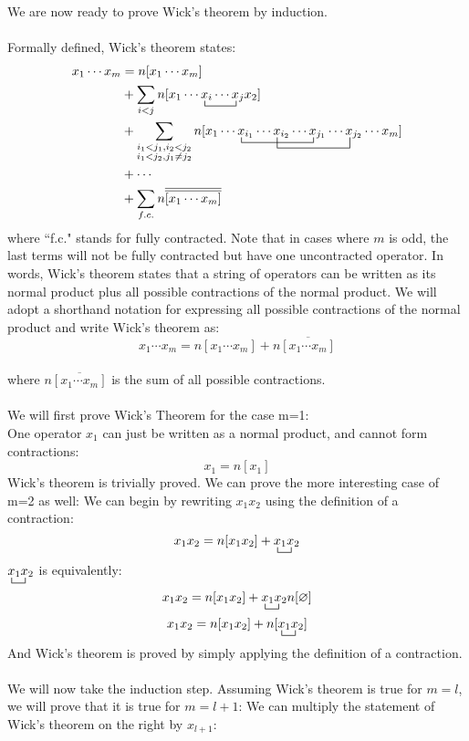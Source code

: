 \documentclass{article}
\newcommand{\ol}{\overline}
\newcommand{\ctr}{\bcontraction}
\newcommand{\cd}{\ensuremath{\cdots} }
\begin{document}
We are now ready to prove Wick's theorem by induction. \\ \\
Formally defined, Wick's theorem states: 
\begin{align*}
x_1 \cd x_m &= n[x_1 \cd x_m ]  \\
&+ \sum_{i < j} \ctr{n[x_1 \cd}{x}{{}_i \cd }{x} n[x_1 \cd x_i \cd x_j x_2] \\
&+ \sum_{\substack{i_1 < j_1,  i_2 < j_2 \\ i_1 < j_2, j_1 \neq j_2}} 
\ctr{n[x_1 \cd}{x}{{}_{i_1} \cd x_{i_2} \cd}{x}
\ctr[2ex]{n[x_1 \cd x_{i_1} \cd }{x}{{}_{i_2} \cd x_{j_1} \cd}{x}
n[x_1 \cd x_{i_1} \cd x_{i_2} \cd x_{j_1} \cd x_{j_2} \cd x_m ]  \\
&+ \cd \\
&+ \sum_{f.c.} n \ol{\ol{[x_1 \cd x_m]  }}
\end{align*}
where ``f.c." stands for fully contracted. 
Note that in cases where $m$ is odd, the last terms will not be fully contracted but have one uncontracted operator. 
In words, Wick's theorem states that a string of operators can be written as its normal product plus all possible contractions of the normal product. 
We will adopt a shorthand notation for expressing all possible contractions of the normal product and write Wick's theorem as: 
\[x_1 \cd x_m = n[x_1 \cd x_m ]  + n\ol{[x_1 \cd x_m ]} \]\\
where $n\ol{[x_1 \cd x_m ]}$ is the sum of all possible contractions.
\\ \\
We will first prove Wick's Theorem for the case m=1: 
\\
One operator $x_1$ can just be written as a normal product, and cannot form contractions:
\[x_1 = n[x_1] \]
Wick's theorem is trivially proved. 
We can prove the more interesting case of m=2 as well: 
We can begin by rewriting $x_1x_2$ using the definition of a contraction:
\[x_1x_2 = n[x_1x_2] + \ctr{}{x}{{}_1}{x} x_1 x_2\]
$\ctr{}{x}{{}_1}{x} x_1 x_2$ is equivalently: 
\[x_1x_2 = n[x_1x_2] + \ctr{}{x}{{}_1}{x} x_1 x_2 n[\varnothing]\]
\[ x_1x_2   = n[x_1x_2] + n[ \ctr{}{x}{{}_1}{x} x_1 x_2] \]
And Wick's theorem is proved by simply applying the definition of a contraction.  \\ \\
We will now take the induction step. Assuming Wick's theorem is true for $m=l$, we will prove that it is true for $m=l+1$: 
We can multiply the statement of Wick's theorem on the right by $x_{l+1}$:
\end{document}
